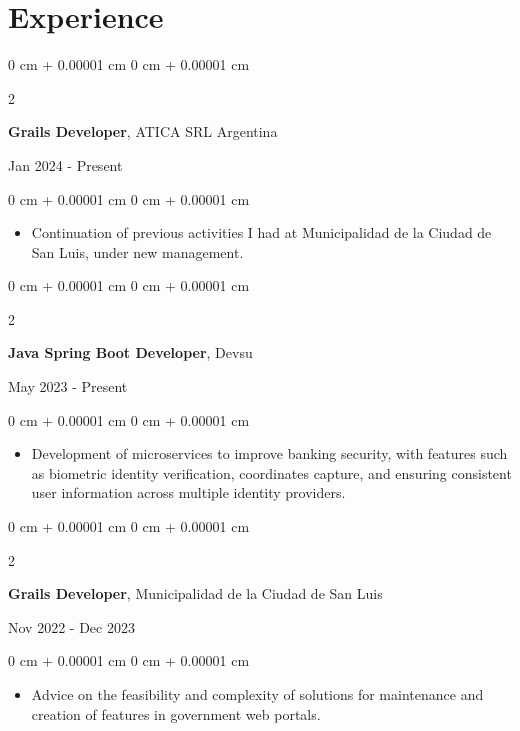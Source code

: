 \documentclass[10pt, letterpaper]{article}
\newenvironment{highlights}{
    \begin{itemize}[
        topsep=0.10 cm,
        parsep=0.10 cm,
        partopsep=0pt,
        itemsep=0pt,
        leftmargin=0 cm + 10pt
    ]
}{
    \end{itemize}
} %
\newenvironment{onecolentry}{
    \begin{adjustwidth}{
        0 cm + 0.00001 cm
    }{
        0 cm + 0.00001 cm
    }
}{
    \end{adjustwidth}
} %
\newenvironment{twocolentry}[2][]{
    \onecolentry
    \def\secondColumn{#2}
    \setcolumnwidth{\fill, 4.5 cm}
    \begin{paracol}{2}
}{
    \switchcolumn \raggedleft \secondColumn
    \end{paracol}
    \endonecolentry
} %
\begin{document}
    \section{Experience}
    \begin{twocolentry}{
        Jan 2024  - Present
    }
    \textbf{Grails Developer}, ATICA SRL Argentina
    \end{twocolentry}
    \vspace{0.10 cm}
    \begin{onecolentry}
        \begin{highlights}
            \item Continuation of previous activities I had at Municipalidad de la Ciudad de San Luis, under new management.
        \end{highlights}
    \end{onecolentry}  
    \vspace{0.2 cm}  
    \begin{twocolentry}{
        May 2023  - Present
    }
    \textbf{Java Spring Boot Developer}, Devsu
    \end{twocolentry}
    \vspace{0.10 cm}
    \begin{onecolentry}
        \begin{highlights}
            \item Development of microservices to improve banking security, with features such as biometric identity verification, coordinates  capture, and ensuring consistent user information across multiple identity providers.
        \end{highlights}
    \end{onecolentry}  
    \vspace{0.2 cm}  
    \begin{twocolentry}{
            Nov 2022  - Dec 2023
        }
    \textbf{Grails Developer}, Municipalidad de la Ciudad de San Luis
    \end{twocolentry}   
    \vspace{0.10 cm}
    \begin{onecolentry}
        \begin{highlights}
            \item Advice on the feasibility and complexity of solutions for maintenance and creation of features in government web portals.
        \end{highlights}
    \end{onecolentry}  
    \vspace{0.10 cm}
\end{document}
